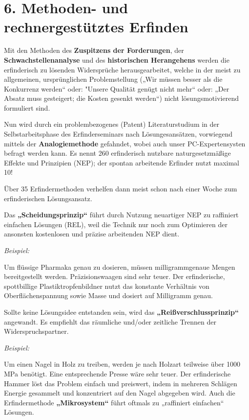 \documentclass[11pt,a4paper]{article}
\begin{document}
\section*{6. Methoden- und rechnergestütztes Erfinden}

Mit den Methoden des \textbf{Zuspitzens der Forderungen}, der
\textbf{Schwachstellenanalyse} und des \textbf{historischen Herangehens}
werden die erfinderisch zu lösenden Widersprüche herausgearbeitet, welche in
der meist zu allgemeinen, ursprünglichen Problemstellung („Wir müssen
besser als die Konkurrenz  werden“ oder: "Unsere Qualität genügt nicht
mehr“ oder: „Der Absatz muss gesteigert; die Kosten gesenkt werden“) nicht
lösungsmotivierend formuliert sind.

Nun wird durch ein problembezogenes (Patent) Literaturstudium in der
Selbstarbeitsphase des Erfinderseminars nach Lösungesansätzen, vorwiegend
mittels der \textbf{Analogiemethode} gefahndet, wobei auch unser
PC-Expertensysten befragt werden kann.  Es nennt 260 erfinderisch nutzbare
naturgesetzmäßige Effekte und Prinzipien (NEP); der spontan arbeitende
Erfinder nutzt maximal 10!

Über 35 Erfindermethoden verhelfen dann meist schon nach einer Woche zum
erfinderischen Lösungsansatz.

Das \textbf{„Scheidungsprinzip“} führt durch Nutzung neuartiger NEP zu
raffiniert einfachen Lösungen (REL), weil die Technik nur noch zum
Optimieren der ansonsten kostenlosen und präzise arbeitenden NEP dient.

\emph{Beispiel:}

Um flüssige Pharmaka genau zu dosieren, müssen milligrammgenaue Mengen
bereitgestellt werden.  Präzisionswaagen sind sehr teuer.  Der erfinderische,
spottbillige Plastiktropfenbildner nutzt das konstante Verhältnis von
Oberflächenspannung sowie Masse und dosiert auf Milligramm genau.

Sollte keine Lösungsidee entstanden sein, wird das
\textbf{„Reißverschlussprinzip“} angewandt. Es empfiehlt das räumliche
und/oder zeitliche Trennen der Widerspruchspartner.

\emph{Beispiel:}

Um einen Nagel in Holz zu treiben, werden je nach Holzart teilweise über
1000\,MPa benötigt.  Eine entsprechende Presse wäre sehr teuer. Der
erfinderische Hammer löst das Problem einfach und preiswert, indem in mehreren
Schlägen Energie gesammelt und konzentriert auf den Nagel abgegeben wird.
Auch die Erfindermethode \textbf{„Mikrosystem“} führt oftmals zu „raffiniert
einfachen“ Lösungen.
\end{document}
